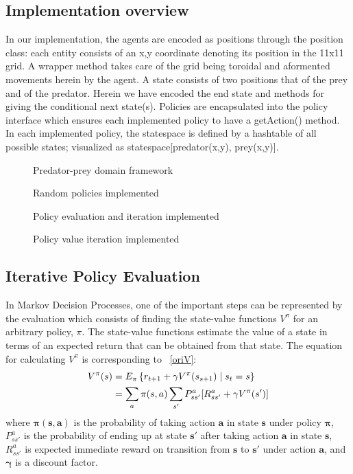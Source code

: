 \documentclass[paper=a4, fontsize=11pt]{scrartcl}
\numberwithin{equation}{section}		%
\numberwithin{figure}{section}			%
\numberwithin{table}{section}				%
\begin{document}
\subsection{Implementation overview}
In our implementation, the agents are encoded as positions through the position class: each entity consists of an x,y coordinate denoting its position in the 11x11 grid. A wrapper method takes care of the grid being toroidal and aformented movements herein by the agent. A state consists of two positions that of the prey and of the predator. Herein we have encoded the end state and methods for giving the conditional next state(s). Policies are encapsulated into the policy interface which ensures each implemented policy to have a getAction() method. In each implemented policy, the statespace is defined by a hashtable of all possible states; visualized as statespace[predator(x,y), prey(x,y)].
\begin{figure}[H] \centering
\caption{Predator-prey domain framework} \label{Predator-prey domain framework}
\end{figure}
\begin{figure}[H] \centering
\caption{Random policies implemented} \label{Policies1}
\end{figure}
\begin{figure}[H] \centering
\caption{Policy evaluation and iteration implemented} \label{Policies2}
\end{figure}
\begin{figure}[H] \centering
\caption{Policy value iteration implemented} \label{Policies3}
\end{figure}

\subsection{Iterative Policy Evaluation}
\label{PEval}
In Markov Decision Processes, one of the important steps can be represented by the evaluation which consists of finding the state-value functions $V^\pi$ for an arbitrary policy, $\pi$. The state-value functions estimate the value of a state in terms of an expected return that can be obtained from that state. The equation for calculating $V^\pi$ is corresponding to ~\ref{oriV}:
\begin{align}
V^\pi(s)&=E_\pi\left\lbrace r_{t+1}+\gamma V^\pi(s_{s+1})\mid s_t=s \right\rbrace\notag\\
&=\sum_{a}\pi(s,a)\sum_{s'}P_{ss'}^a[R_{ss'}^a+\gamma V^\pi(s')] \label{oriV}
\end{align}
where $\mathbf{\pi(s,a)}$ is the probability of taking action $\mathbf{a}$ in state $\mathbf{s}$ under policy $\mathbf{\pi}$, $P_{ss'}^a$ is the probability of ending up at state $\mathbf{s'}$ after taking action $\mathbf{a}$ in state $\mathbf{s}$, $R_{ss'}^a$ is expected immediate reward on transition from $\mathbf{s}$ to $\mathbf{s'}$ under action $\mathbf{a}$, and $\mathbf{\gamma}$ is a discount factor.\\
\end{document}
